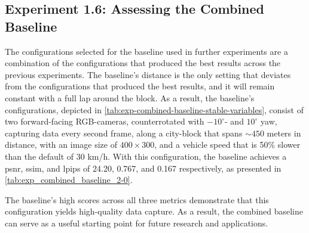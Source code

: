 \subsection{Experiment 1.6: Assessing the Combined Baseline} \label{sec:exp-combined-baseline}
The configurations selected for the baseline used in further experiments are a combination of the configurations that produced the best results across the previous experiments. The baseline's distance is the only setting that deviates from the configurations that produced the best results, and it will remain constant with a full lap around the block. As a result, the baseline's configurations, depicted in \autoref{tab:exp-combined-baseline-stable-variables}, consist of two forward-facing RGB-cameras, counterrotated with $-10^\circ$- and $10^\circ$ yaw, capturing data every second frame, along a city-block that spans $\sim450$ meters in distance, with an image size of $400 \times 300$, and a vehicle speed that is 50\% slower than the default of 30 km/h. With this configuration, the baseline achieves a \acrshort{psnr}, \acrshort{ssim}, and \acrshort{lpips} of 24.20, 0.767, and 0.167 respectively, as presented in \autoref{tab:exp_combined_baseline_2-0}.

The baseline's high scores across all three metrics demonstrate that this configuration yields high-quality data capture. As a result, the combined baseline can serve as a useful starting point for future research and applications.


